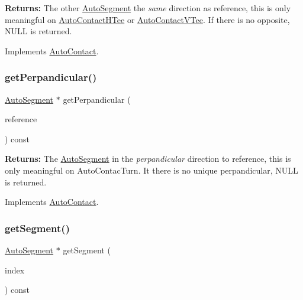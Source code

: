 {\bfseries Returns\+:} The other \mbox{\hyperlink{classKatabatic_1_1AutoSegment}{Auto\+Segment}} the {\itshape same} direction as {\ttfamily reference}, this is only meaningful on \mbox{\hyperlink{classKatabatic_1_1AutoContactHTee}{Auto\+Contact\+H\+Tee}} or \mbox{\hyperlink{classKatabatic_1_1AutoContactVTee}{Auto\+Contact\+V\+Tee}}. If there is no opposite, {\ttfamily N\+U\+LL} is returned. 

Implements \mbox{\hyperlink{classKatabatic_1_1AutoContact_a48ab1d3bdf85712e4784ef83ef136939}{Auto\+Contact}}.

\mbox{\label{classKatabatic_1_1AutoContactTurn_ad99dd549214e43b6509fd8e3aefae919}} 
\subsubsection{\texorpdfstring{get\+Perpandicular()}{getPerpandicular()}}
{\footnotesize\ttfamily \mbox{\hyperlink{classKatabatic_1_1AutoSegment}{Auto\+Segment}} $\ast$ get\+Perpandicular (\begin{DoxyParamCaption}\item[{const \mbox{\hyperlink{classKatabatic_1_1AutoSegment}{Auto\+Segment}} $\ast$}]{reference }\end{DoxyParamCaption}) const\hspace{0.3cm}{\ttfamily [virtual]}}

{\bfseries Returns\+:} The \mbox{\hyperlink{classKatabatic_1_1AutoSegment}{Auto\+Segment}} in the {\itshape perpandicular} direction to {\ttfamily reference}, this is only meaningful on Auto\+Contac\+Turn. It there is no unique perpandicular, {\ttfamily N\+U\+LL} is returned. 

Implements \mbox{\hyperlink{classKatabatic_1_1AutoContact_a994371005874f946cc0ac78005d38423}{Auto\+Contact}}.

\mbox{\label{classKatabatic_1_1AutoContactTurn_a99fa8a78e97a29f2fb5730eaaa59acfc}} 
\subsubsection{\texorpdfstring{get\+Segment()}{getSegment()}}
{\footnotesize\ttfamily \mbox{\hyperlink{classKatabatic_1_1AutoSegment}{Auto\+Segment}} $\ast$ get\+Segment (\begin{DoxyParamCaption}\item[{unsigned int}]{index }\end{DoxyParamCaption}) const\hspace{0.3cm}{\ttfamily [virtual]}}

